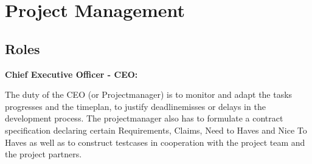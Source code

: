 
\section{Project Management}





% 
% 
% 
% 
% 
% 

\subsection{Roles}

\textbf{Chief Executive Officer - CEO: }

The duty of the CEO (or Projectmanager) is to monitor and adapt the tasks progresses and the timeplan, to justify deadlinemisses or delays in the development process.
The projectmanager also has to formulate a contract specification declaring certain Requirements, Claims, Need to Haves and Nice To Haves as well as to construct testcases in cooperation with the project team and the project partners.


